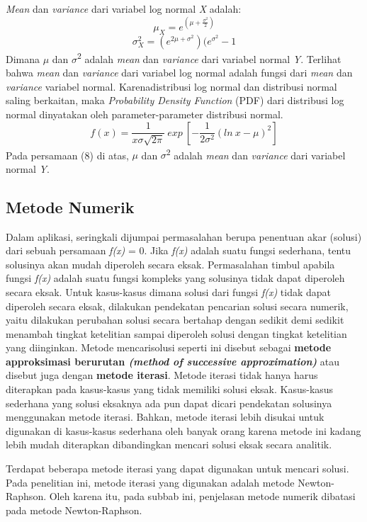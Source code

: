 \documentclass[
]{book}
\begin{document}
\emph{Mean} dan \emph{variance} dari variabel log normal \emph{X} adalah:
\[\mu_X = e^{(\mu+\frac{\sigma^2}{2})}\]
\[\sigma^2_X = (e^{2\mu+\sigma^2})(e^{\sigma^2}-1\]
Dimana \(\mu\) dan \(\sigma\)\textsuperscript{2} adalah \emph{mean} dan \emph{variance} dari variabel normal \emph{Y}. Terlihat bahwa \emph{mean} dan \emph{variance} dari variabel log normal adalah fungsi dari \emph{mean} dan \emph{variance} variabel normal. Karenadistribusi log normal dan distribusi normal saling berkaitan, maka \emph{Probability Density Function} (PDF) dari distribusi log normal dinyatakan oleh parameter-parameter distribusi normal.
\[f(x) = \frac{1}{x\sigma\sqrt{2\pi}}\ exp\ [-\frac{1}{2\sigma^2}(ln\ x-\mu)^2]\]
Pada persamaan (8) di atas, \(\mu\) dan \(\sigma\)\textsuperscript{2} adalah \emph{mean} dan \emph{variance} dari variabel normal \emph{Y}.

\hypertarget{metode-numerik}{%
\subsection{Metode Numerik}\label{metode-numerik}}

Dalam aplikasi, seringkali dijumpai permasalahan berupa penentuan akar (solusi) dari sebuah persamaan \emph{f(x)} = 0. Jika \emph{f(x)} adalah suatu fungsi sederhana, tentu solusinya akan mudah diperoleh secara eksak. Permasalahan timbul apabila fungsi \emph{f(x)} adalah suatu fungsi kompleks yang solusinya tidak dapat diperoleh secara eksak. Untuk kasus-kasus dimana solusi dari fungsi \emph{f(x)} tidak dapat diperoleh secara eksak, dilakukan pendekatan pencarian solusi secara numerik, yaitu dilakukan perubahan solusi secara bertahap dengan sedikit demi sedikit menambah tingkat ketelitian sampai diperoleh solusi dengan tingkat ketelitian yang diinginkan. Metode mencarisolusi seperti ini disebut sebagai \textbf{metode approksimasi berurutan \emph{(method of successive approximation)}} atau disebut juga dengan \textbf{metode iterasi}. Metode iterasi tidak hanya harus diterapkan pada kasus-kasus yang tidak memiliki solusi eksak. Kasus-kasus sederhana yang solusi eksaknya ada pun dapat dicari pendekatan solusinya menggunakan metode iterasi. Bahkan, metode iterasi lebih disukai untuk digunakan di kasus-kasus sederhana oleh banyak orang karena metode ini kadang lebih mudah diterapkan dibandingkan mencari solusi eksak secara analitik.

Terdapat beberapa metode iterasi yang dapat digunakan untuk mencari solusi. Pada penelitian ini, metode iterasi yang digunakan adalah metode Newton-Raphson. Oleh karena itu, pada subbab ini, penjelasan metode numerik dibatasi pada metode Newton-Raphson.
\end{document}
